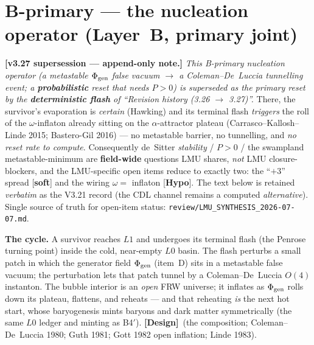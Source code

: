 \documentclass[11pt]{article}
\newcommand{\Design}{\textbf{\textcolor{purple!65!black}{[Design]}}}
\begin{document}
\section*{B-primary --- the nucleation operator (Layer~B, primary joint)}
\noindent\textbf{[v3.27 supersession --- append-only note.]} \emph{This B-primary nucleation operator (a metastable $\Phi_{\rm gen}$ false vacuum $\to$ a Coleman--De~Luccia tunnelling event; a \textbf{probabilistic} reset that needs $P>0$) is superseded as the \emph{primary} reset by the \textbf{deterministic flash} of ``Revision history (3.26 $\to$ 3.27)''.} There, the survivor's evaporation is \emph{certain} (Hawking) and its terminal flash \emph{triggers} the roll of the $\omega$-inflaton already sitting on the $\alpha$-attractor plateau (Carrasco--Kallosh--Linde 2015; Bastero-Gil 2016) --- no metastable barrier, no tunnelling, and \emph{no reset rate to compute}. Consequently de~Sitter \emph{stability} / $P>0$ / the swampland metastable-minimum are \textbf{field-wide} questions LMU shares, \emph{not} LMU closure-blockers, and the LMU-specific open items reduce to exactly two: the ``$+3$'' spread [\textbf{soft}] and the wiring $\omega=$ inflaton [\textbf{Hypo}]. The text below is retained \emph{verbatim} as the V3.21 record (the CDL channel remains a computed \emph{alternative}). Single source of truth for open-item status: \texttt{review/LMU\_SYNTHESIS\_2026-07-07.md}.

\medskip
\noindent\textbf{The cycle.} A survivor reaches $L1$ and undergoes its terminal flash (the Penrose turning point) inside the cold, near-empty $L0$ basin. The flash perturbs a small patch in which the generator field $\Phi_{\rm gen}$ (item~D) sits in a metastable false vacuum; the perturbation lets that patch tunnel by a Coleman--De~Luccia $O(4)$ instanton. The bubble interior is an \emph{open} FRW universe; it inflates as $\Phi_{\rm gen}$ rolls down its plateau, flattens, and reheats --- and that reheating \emph{is} the next hot start, whose baryogenesis mints baryons and dark matter symmetrically (the same $L0$ ledger and minting as B4$'$). \Design\ (the composition; Coleman--De~Luccia 1980; Guth 1981; Gott 1982 open inflation; Linde 1983).
\end{document}
